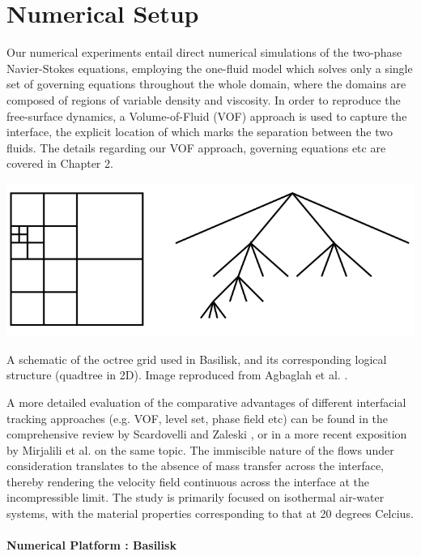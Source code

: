 \section{Numerical Setup}
Our numerical experiments entail direct numerical simulations of the two-phase
Navier-Stokes equations, employing the one-fluid model which  
solves only a single set of governing equations throughout the whole domain,
where the domains are composed of regions of variable density and viscosity. 
In order to reproduce the free-surface dynamics, a Volume-of-Fluid 
(VOF) approach is used to capture the interface, the explicit location 
of which marks the separation between the two fluids.
The details regarding our VOF approach, governing equations etc
are covered in Chapter 2. 

\begin{marginfigure}
\centering
\includegraphics{plots/ligament_breakup/octree.png}
\caption{A schematic of the octree grid used in Basilisk, and its
	corresponding logical structure (quadtree in 2D).
	Image reproduced from Agbaglah et al. \cite{agbag}.
	}
\label{octree}
\end{marginfigure}


A more detailed evaluation of the comparative advantages of different  
interfacial tracking approaches (e.g. VOF, level set, phase field etc) 
can be found in the comprehensive review by Scardovelli and Zaleski 
\cite{zaleskiannual}, or in a more recent exposition by  
Mirjalili et al. \cite{mirjalili2017interface} on the same topic.
The immiscible nature of the flows under consideration translates to the 
absence of mass transfer across the interface, thereby rendering the 
velocity field continuous across the interface at the incompressible limit. 
The study is primarily focused on isothermal air-water systems, with 
the material properties corresponding to that at 20 degrees Celcius. 

\paragraph{Numerical Platform : Basilisk}

